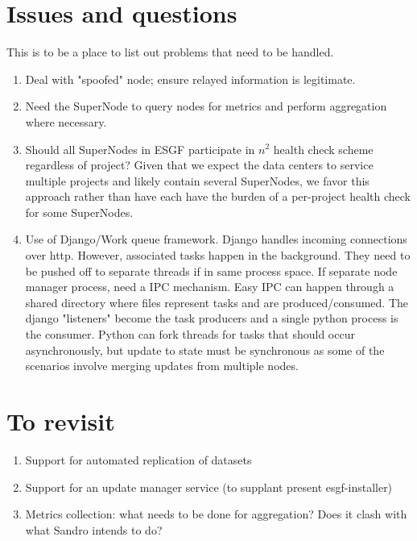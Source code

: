 \documentclass[oneside,12pt]{memoir}
\begin{document}
\section{Issues and questions}
This is to be a place to list out problems that need to be handled.
\begin{enumerate}


\item
Deal with "spoofed" node; ensure relayed information is legitimate. 
\item
Need the SuperNode to query nodes for metrics and perform aggregation where necessary.
\item
Should all SuperNodes in ESGF participate in $n^2$ health check scheme regardless of project? Given that we expect the data centers to service multiple projects and likely contain several SuperNodes, we favor this approach rather than have each have the burden of a per-project health check for some SuperNodes.
\item  Use of Django/Work queue framework.  Django handles incoming connections over http.  However, associated tasks happen in the background.  They need to be pushed off to separate threads if in same process space.  If separate node manager process, need a IPC mechanism.  Easy IPC can happen through a shared directory where files represent tasks and are produced/consumed.  The django "listeners" become the task producers and a single python process is the consumer.   Python can fork threads for tasks that should occur asynchronously, but update to state must be synchronous as some of the scenarios involve merging updates from multiple nodes.



\end{enumerate}

\section{To revisit}
\begin{enumerate}
\item Support for automated replication of datasets
\item Support for an update manager service (to supplant present esgf-installer)
\item Metrics collection: what needs to be done for aggregation? Does it clash with what Sandro intends to do?
\end{enumerate}
\end{document}
